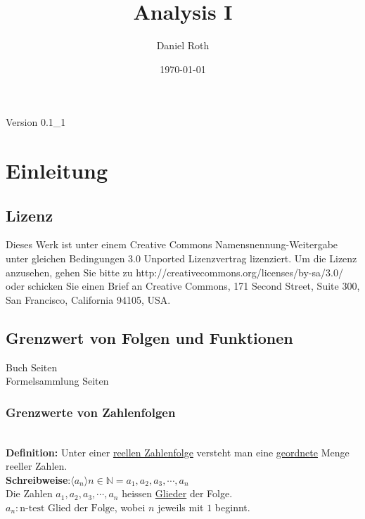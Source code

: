 \documentclass[11pt]{amsart}
\title{Analysis I}
\author{Daniel Roth}
\date{\today}
\theoremstyle{remark}
\begin{document}
\begin{titlepage}
\maketitle
\begin{table}[b]
\begin{center}
Version 0.1\_1
\end{center}
\end{table}
\end{titlepage}

\tableofcontents
\newpage
\chapter{Einleitung}
\section{Lizenz}
Dieses Werk ist unter einem Creative Commons Namensnennung-Weitergabe unter gleichen Bedingungen 3.0 Unported Lizenzvertrag lizenziert. Um die Lizenz anzusehen, gehen Sie bitte zu http://creativecommons.org/licenses/by-sa/3.0/ oder schicken Sie einen Brief an Creative Commons, 171 Second Street, Suite 300, San Francisco, California 94105, USA.

\section{Grenzwert von Folgen und Funktionen}
Buch Seiten
\\Formelsammlung Seiten
\subsection{Grenzwerte von Zahlenfolgen}
\textbf{ \\Definition:} Unter einer \underline{reellen Zahlenfolge} versteht man eine \underline{geordnete} Menge reeller Zahlen.\\
\textbf{Schreibweise}:$\langle a_n\rangle n\in\mathbb{N}= a_1, a_2, a_3, \dotsb, a_n$\\
Die Zahlen $a_1,a_2,a_3, \dotsb , a_n$ heissen \underline{Glieder} der Folge. \\$a_n : \text{n-test Glied der Folge}$, wobei $n$ jeweils mit $1$ beginnt.
\end{document}
